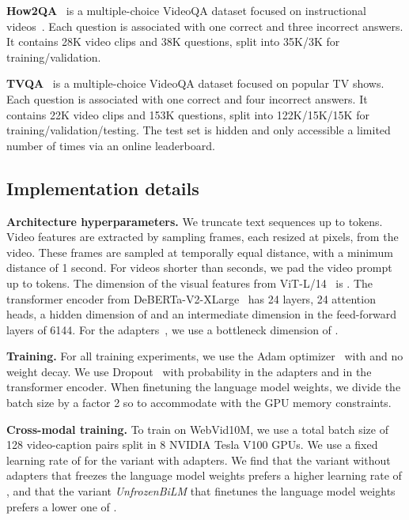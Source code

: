 \noindent \textbf{How2QA}~\cite{li2020hero} is a multiple-choice VideoQA dataset focused on instructional videos~\cite{miech19howto100m}.
Each question is associated with one correct and three incorrect answers. 
It contains 28K video clips and 38K questions, split into 35K/3K for training/validation.

\noindent \textbf{TVQA}~\cite{lei2018tvqa} is a multiple-choice VideoQA dataset focused on popular TV shows.
Each question is associated with one correct and four incorrect answers. 
It contains 22K video clips and 153K questions, split into 122K/15K/15K for training/validation/testing.
The test set is hidden and only accessible a limited number of times via an online leaderboard.

\subsection{Implementation details}\label{sec:addimplem}

\noindent \textbf{Architecture hyperparameters.} 
We truncate text sequences up to  tokens.
Video features are extracted by sampling  frames, each resized at  pixels, from the video.
These frames are sampled at temporally equal distance, with a minimum distance of 1 second.
For videos shorter than  seconds, we pad the video prompt up to  tokens.
The dimension of the visual features from ViT-L/14~\cite{dosovitskiy2021an} is .
The transformer encoder from DeBERTa-V2-XLarge~\cite{he2021deberta} has 24 layers, 24 attention heads, a hidden dimension of  and an intermediate dimension in the feed-forward layers of 6144.
For the adapters~\cite{houlsby2019parameter}, we use a bottleneck dimension of .

\noindent \textbf{Training.} 
For all training experiments, we use the Adam optimizer~\cite{kingma15adam} with  and no weight decay.
We use Dropout~\cite{srivastava2014dropout} with probability  in the adapters and in the transformer encoder.
When finetuning the language model weights, we divide the batch size by a factor 2 so to accommodate with the GPU memory constraints.

\noindent \textbf{Cross-modal training.}
To train on WebVid10M, we use a total batch size of 128 video-caption pairs split in 8 NVIDIA Tesla V100 GPUs.
We use a fixed learning rate of  for the variant with adapters.
We find that the variant without adapters that freezes the language model weights prefers a higher learning rate of , and that the variant \textit{UnfrozenBiLM} that finetunes the language model weights prefers a lower one of .

